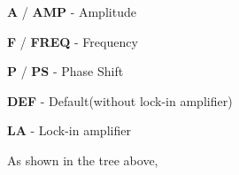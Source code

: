 \documentclass[twocolumn]{article}\usepackage[english]{babel}
\begin{document}
\begin{Steps}
 \item{\textbf{A} / \textbf{AMP} - Amplitude}
 \item{\textbf{F} / \textbf{FREQ} - Frequency }
 \item{\textbf{P} / \textbf{PS}  - Phase Shift}
 \item{\textbf{DEF} - Default(without lock-in amplifier)}
 \item{\textbf{LA} - Lock-in amplifier}
\end{Steps}
\newline \newline
As shown in the tree above,
\end{document}
